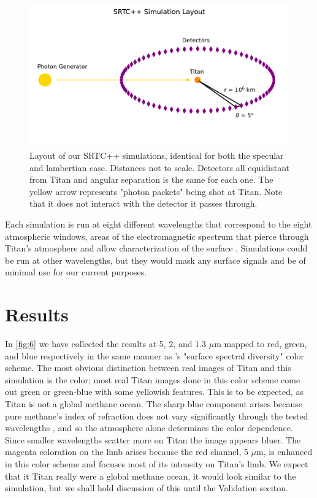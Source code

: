 \documentclass[twocolumn,linenumbers]{aastex631}
\begin{document}
\begin{figure}[htbp]
\includegraphics[scale = 0.5]{SRTCLayout.pdf}
\centering
\caption{Layout of our SRTC++ simulations, identical for both the specular and lambertian case. Distances not to scale. Detectors all equidistant from Titan and angular separation is the same for each one. The yellow arrow represents "photon packets" being shot at Titan. Note that it does not interact with the detector it passes through.}
\label{fig:5}
\end{figure}

Each simulation is run at eight different wavelengths that correspond to the eight atmospheric windows, areas of the electromagnetic spectrum that pierce through Titan's atmosphere and allow characterization of the surface \citep{Barnes2007}. Simulations could be run at other wavelengths, but they would mask any surface signals and be of minimal use for our current purposes. 

\section{Results} \label{sec:results}

In \ref{fig:6} we have collected the results at 5, 2, and 1.3 $\mu$m mapped to red, green, and blue respectively in the same manner as \cite{Barnes2018}'s "surface spectral diversity" color scheme. The most obvious distinction between real images of Titan and this simulation is the color; most real Titan images done in this color scheme come out green or green-blue with some yellowish features. This is to be expected, as Titan is not a global methane ocean. The sharp blue component arises because pure methane's index of refraction does not vary significantly through the tested wavelengths \citep{Martonchik1994}, and so the atmosphere alone determines the color dependence. Since smaller wavelengths scatter more on Titan \citep{EsSayeh2023} the image appears bluer. The magenta coloration on the limb arises because the red channel, 5 $\mu$m, is enhanced in this color scheme and focuses most of its intensity on Titan's limb. We expect that it Titan really were a global methane ocean, it would look similar to the simulation, but we shall hold discussion of this until the Validation seciton.
\end{document}
